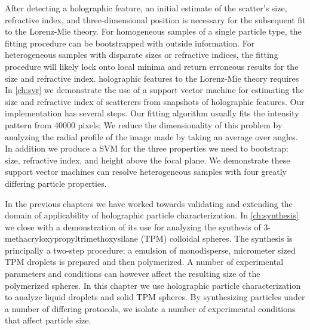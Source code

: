 After detecting a holographic feature, an initial estimate of the
scatter's size, refractive index, and three-dimensional position
is necessary for the subsequent fit to the Lorenz-Mie theory.
For homogeneous samples of a single particle type, the fitting procedure
can be bootstrapped with outside information. For heterogeneous samples
with disparate sizes or refractive indices, the fitting procedure
will likely lock onto local minima and return erroneous results for
the size and refractive index. holographic features to the Lorenz-Mie theory requires
In \autoref{ch:svr} we demonstrate the use of a support vector machine for
estimating the size and refractive index of scatterers from snapshots
of holographic features. Our implementation has several steps. Our fitting
algorithm usually fits the intensity pattern from \SI{40000}{} pixels;
We reduce the dimensionality of this problem by analyzing the radial
profile of the image made by taking an average over angles. In addition
we produce a SVM for the three properties we need to bootstrap:
size, refractive index, and height above the focal plane. We demonstrate these
support vector machines can resolve heterogeneous samples with four greatly
differing particle properties.

In the previous chapters we have worked towards validating and extending
the domain of applicability of holographic particle characterization.
In \autoref{ch:synthesis} we close with a demonstration of its use for
analyzing the synthesis of \num{3}-methacryloxypropyltrimethoxysilane (TPM) colloidal
spheres. The synthesis is principally a two-step procedure: a emulsion of monodisperse,
micrometer sized TPM droplets is prepared and then polymerized.
A number of experimental parameters and conditions can however affect
the resulting size of the polymerized spheres. In this chapter we use
holographic particle characterization to analyze liquid droplets and
solid TPM spheres. By synthesizing particles under a number of
differing protocols, we isolate a number of experimental conditions
that affect particle size.
